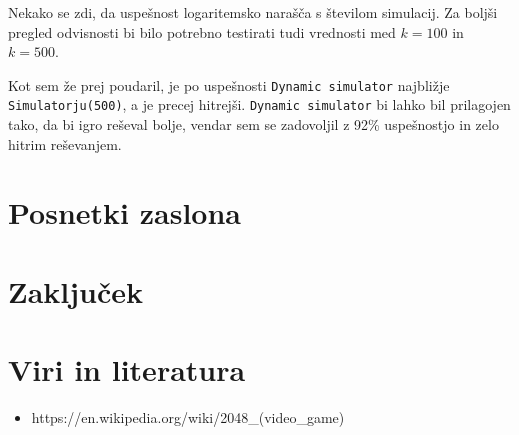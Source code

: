 \documentclass{article}
\begin{document}
Nekako se zdi, da uspešnost logaritemsko narašča s številom simulacij. Za boljši pregled odvisnosti bi bilo potrebno testirati tudi vrednosti med $k=100$ in $k=500$.

Kot sem že prej poudaril, je po uspešnosti \texttt{Dynamic simulator} najbližje \texttt{Simulatorju(500)}, a je precej hitrejši. \texttt{Dynamic simulator} bi lahko bil prilagojen tako, da bi igro reševal bolje, vendar sem se zadovoljil z 92\% uspešnostjo in zelo hitrim reševanjem.

\section{Posnetki zaslona}

\section{Zaključek}

\section{Viri in literatura}
\begin{itemize}
    \item https://en.wikipedia.org/wiki/2048_(video_game)
\end{itemize}
\end{document}

